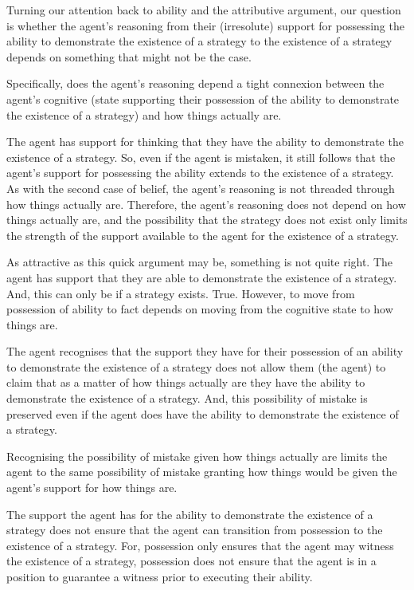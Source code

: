 \documentclass[10pt]{article}
\begin{document}
\begin{note}
  Turning our attention back to ability and the attributive argument, our question is whether the agent's reasoning from their (irresolute) support for possessing the ability to demonstrate the existence of a strategy to the existence of a strategy depends on something that might not be the case.

  Specifically, does the agent's reasoning depend a tight connexion between the agent's cognitive (state supporting their possession of the ability to demonstrate the existence of a strategy) and how things actually are.

  The agent has support for thinking that they have the ability to demonstrate the existence of a strategy.
  So, even if the agent is mistaken, it still follows that the agent's support for possessing the ability extends to the existence of a strategy.
  As with the second case of belief, the agent's reasoning is not threaded through how things actually are.
  Therefore, the agent's reasoning does not depend on how things actually are, and the possibility that the strategy does not exist only limits the strength of the support available to the agent for the existence of a strategy.

  As attractive as this quick argument may be, something is not quite right.
  The agent has support that they are able to demonstrate the existence of a strategy.
  And, this can only be if a strategy exists.
  True.
  However, to move from possession of ability to fact depends on moving from the cognitive state to how things are.

  The agent recognises that the support they have for their possession of an ability to demonstrate the existence of a strategy does not allow them (the agent) to claim that as a matter of how things actually are they have the ability to demonstrate the existence of a strategy.
  And, this possibility of mistake is preserved even if the agent does have the ability to demonstrate the existence of a strategy.

  Recognising the possibility of mistake given how things actually are limits the agent to the same possibility of mistake granting how things would be given the agent's support for how things are.

  The support the agent has for the ability to demonstrate the existence of a strategy does not ensure that the agent can transition from possession to the existence of a strategy.
  For, possession only ensures that the agent may witness the existence of a strategy, possession does not ensure that the agent is in a position to guarantee a witness prior to executing their ability.


\end{note}
\end{document}
